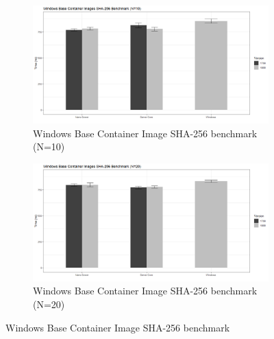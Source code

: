 \begin{figure}[h]
	\begin{subfigure}{\textwidth}
	\captionsetup{width=0.8\linewidth}
	\includegraphics[width=0.9\linewidth]{img/Methodologie/Containers4.png}
	\centering
	\caption{Windows Base Container Image SHA-256 benchmark (N=10)}
	\end{subfigure}
	\begin{subfigure}{\textwidth}
	\captionsetup{width=0.8\linewidth}
	\includegraphics[width=0.9\linewidth]{img/Methodologie/Containers2.png}
	\centering
	\caption{Windows Base Container Image SHA-256 benchmark (N=20)}
	\end{subfigure}
	\label{fig:SHABenchmark}
	\caption[SHA-256 benchmark]{Windows Base Container Image SHA-256 benchmark}
\end{figure}